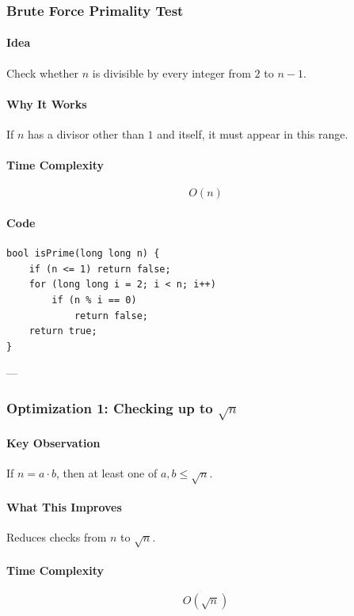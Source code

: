 \documentclass[11pt]{article}
\begin{document}
\subsubsection{Brute Force Primality Test}

\paragraph{Idea}
Check whether $n$ is divisible by every integer from $2$ to $n-1$.

\paragraph{Why It Works}
If $n$ has a divisor other than $1$ and itself, it must appear in this range.

\paragraph{Time Complexity}
\[
O(n)
\]

\paragraph{Code}
\begin{lstlisting}
bool isPrime(long long n) {
    if (n <= 1) return false;
    for (long long i = 2; i < n; i++)
        if (n % i == 0)
            return false;
    return true;
}
\end{lstlisting}

---

\subsubsection{Optimization 1: Checking up to $\sqrt{n}$}

\paragraph{Key Observation}
If $n = a \cdot b$, then at least one of $a, b \le \sqrt{n}$.

\paragraph{What This Improves}
Reduces checks from $n$ to $\sqrt{n}$.

\paragraph{Time Complexity}
\[
O(\sqrt{n})
\]
\end{document}
